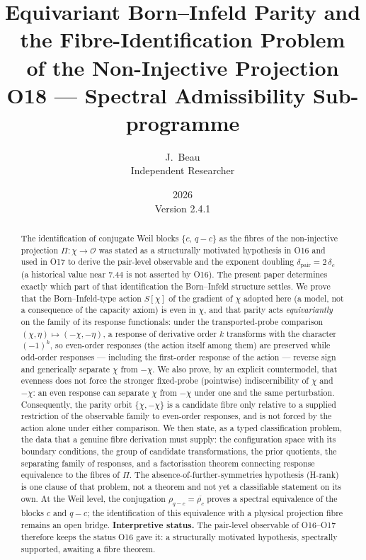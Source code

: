 \documentclass[11pt,a4paper]{article}
\title{%
  Equivariant Born--Infeld Parity and the Fibre-Identification Problem\\
  of the Non-Injective Projection\\[4pt]
  \large O18 --- Spectral Admissibility Sub-programme%
}
\author{J.~Beau\\[2pt]
\small Independent Researcher}
\date{2026\\Version 2.4.1}
\newcommand{\dpair}{\delta_{\mathrm{pair}}}
\newcommand{\Proj}{\Pi}
\newcommand{\chifield}{\chi}
\newcommand{\Obs}{\mathcal{O}}
\newcommand{\rhoc}{\rho_{c}}
\newcommand{\rhoqc}{\rho_{q-c}}
\begin{document}
  \maketitle
  \vspace{-3\baselineskip}

  \begin{abstract}
    \footnotesize
    The identification of conjugate Weil blocks $\{c,\, q-c\}$ as the fibres of the
    non-injective projection $\Proj:\chifield\to\Obs$ was stated as a structurally motivated
    hypothesis in O16 and used in O17 to derive the
    pair-level observable and the exponent doubling $\dpair = 2\,\delta_{c}$ (a historical value near
    $7.44$ is not asserted by O16).
    The present paper determines exactly which part of that identification the Born--Infeld
    structure settles.
    We prove that the Born--Infeld-type action $S[\chifield]$ of the gradient of $\chifield$
    adopted here (a model, not a consequence of the capacity axiom) is even in $\chifield$, and that
    parity acts \emph{equivariantly} on the family of its response functionals: under the
    transported-probe comparison $(\chifield,\eta)\mapsto(-\chifield,-\eta)$, a response of
    derivative order $k$ transforms with the character $(-1)^{k}$, so even-order responses
    (the action itself among them) are preserved while odd-order responses --- including the
    first-order response of the action --- reverse sign and generically separate
    $\chifield$ from $-\chifield$.
    We also prove, by an explicit countermodel, that evenness does not force the stronger
    fixed-probe (pointwise) indiscernibility of $\chifield$ and $-\chifield$: an even
    response can separate $\chifield$ from $-\chifield$ under one and the same perturbation.
    Consequently, the parity orbit $\{\chifield,-\chifield\}$ is a candidate fibre only
    relative to a supplied restriction of the observable family to even-order responses, and
    is not forced by the action alone under either comparison.
    We then state, as a typed classification problem, the data that a genuine fibre
    derivation must supply: the configuration space with its boundary conditions, the group
    of candidate transformations, the prior quotients, the separating family of responses,
    and a factorisation theorem connecting response equivalence to the fibres of $\Proj$.
    The absence-of-further-symmetries hypothesis (H-rank) is one clause of that problem, not
    a theorem and not yet a classifiable statement on its own.
    At the Weil level, the conjugation $\rhoqc = \overline{\rhoc}$ proves a spectral
    equivalence of the blocks $c$ and $q-c$; the identification of this equivalence with a
    physical projection fibre remains an open bridge.
    \textbf{Interpretive status.}
    The pair-level observable of O16--O17 therefore keeps the status O16 gave it: a
    structurally motivated hypothesis, spectrally supported, awaiting a fibre theorem.
  \end{abstract}
\end{document}
